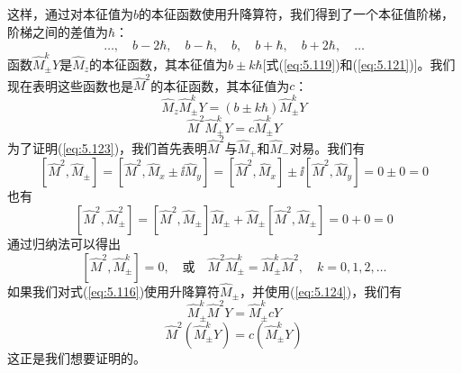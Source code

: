     这样，通过对本征值为$b$的本征函数使用升降算符，我们得到了一个本征值阶梯，阶梯之间的差值为$\hbar$：
    \begin{equation*}
        \ldots, \quad b-2\hbar, \quad b-\hbar, \quad b, \quad b+\hbar, \quad b+2\hbar, \quad \ldots
    \end{equation*}
    函数$\hat{M}_{\pm}^kY$是$\hat{M}_z$的本征函数，其本征值为$b \pm k\hbar$[式(\ref{eq:5.119})和(\ref{eq:5.121})]。我们现在表明这些函数也是$\hat{M}^2$的本征函数，其本征值为$c$：
    \begin{equation}
        \hat{M}_z\hat{M}_{\pm}^kY = \left(b \pm k\hbar\right)\hat{M}_{\pm}^kY
        \label{eq:5.122}
    \end{equation}
    \begin{equation}
        \hat{M}^2\hat{M}_{\pm}^kY = c\hat{M}_{\pm}^kY
        \label{eq:5.123}
    \end{equation}
    为了证明(\ref{eq:5.123})，我们首先表明$\hat{M}^2$与$\hat{M}_+$和$\hat{M}_-$对易。我们有
    \begin{equation*}
        \left[\hat{M}^2,\hat{M}_{\pm}\right] = \left[\hat{M}^2,\hat{M}_x\pm\ii \hat{M}_y\right] = \left[\hat{M}^2,\hat{M}_x\right] \pm \ii \left[\hat{M}^2,\hat{M}_y\right] = 0 \pm 0 = 0
    \end{equation*}
    也有
    \begin{equation*}
        \left[\hat{M}^2,\hat{M}_{\pm}^2\right] = \left[\hat{M}^2,\hat{M}_{\pm}\right]\hat{M}_{\pm} + \hat{M}_{\pm}\left[\hat{M}^2,\hat{M}_{\pm}\right] = 0 + 0 = 0
    \end{equation*}
    通过归纳法可以得出
    \begin{equation}
        \left[\hat{M}^2,\hat{M}_{\pm}^k\right] = 0, \quad \text{或} \quad \hat{M}^2\hat{M}_{\pm}^k = \hat{M}_{\pm}^k\hat{M}^2, \quad k = 0, 1, 2, \ldots
        \label{eq:5.124}
    \end{equation}
    如果我们对式(\ref{eq:5.116})使用升降算符$\hat{M}_{\pm}$，并使用(\ref{eq:5.124})，我们有
    \begin{equation*}
        \hat{M}_{\pm}^k\hat{M}^2Y = \hat{M}_{\pm}^k cY
    \end{equation*}
    \begin{equation}
        \hat{M}^2\left(\hat{M}_{\pm}^kY\right) = c\left(\hat{M}_{\pm}^kY\right)
        \label{eq:5.125}
    \end{equation}
    这正是我们想要证明的。

